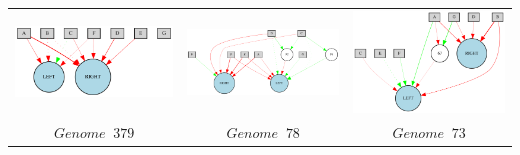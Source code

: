 \begin{table}[h]
\centering
\begin{tabular}{ccc}
\includegraphics[scale=0.3]{include/images/thymio_network_379.PNG} & \includegraphics[scale=0.3]{include/images/thymio_network_78.PNG} & \includegraphics[scale=0.3]{include/images/thymio_network_73.PNG} \\
$$Genome \;  \; 379$$  & $$Genome \;  \; 78$$  & $Genome \;  \; 73$  \\

\end{tabular}
\end{table}
